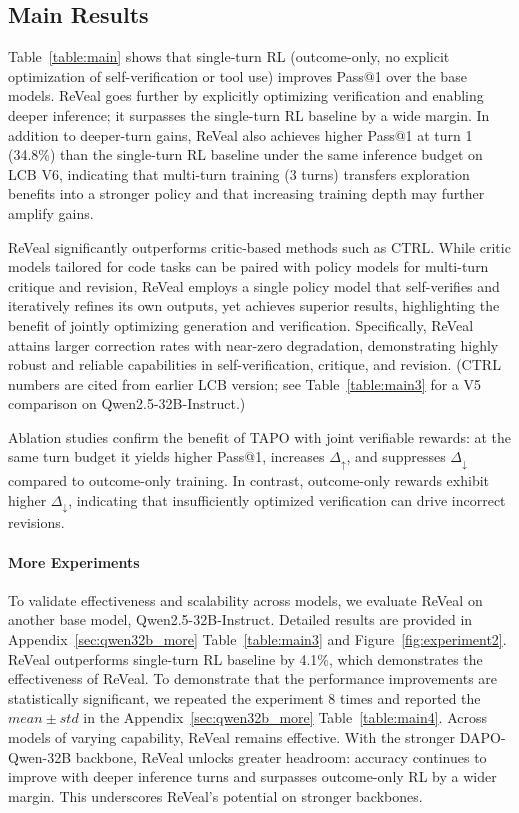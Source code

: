 \documentclass{article} %
\begin{document}
\subsection{Main Results}
Table~\ref{table:main} shows that single-turn RL (outcome-only, no explicit optimization of self-verification or tool use) improves Pass@1 over the base models. ReVeal goes further by explicitly optimizing verification and enabling deeper inference; it surpasses the single-turn RL baseline by a wide margin. In addition to deeper-turn gains, ReVeal also achieves higher Pass@1 at turn 1 (34.8\%) than the single-turn RL baseline under the same inference budget on LCB V6, indicating that multi-turn training (3 turns) transfers exploration benefits into a stronger policy and that increasing training depth may further amplify gains.

ReVeal significantly outperforms critic-based methods such as CTRL. While critic models tailored for code tasks can be paired with policy models for multi-turn critique and revision, ReVeal employs a single policy model that self-verifies and iteratively refines its own outputs, yet achieves superior results, highlighting the benefit of jointly optimizing generation and verification. Specifically, ReVeal attains larger correction rates with near-zero degradation, demonstrating highly robust and reliable capabilities in self-verification, critique, and revision. (CTRL numbers are cited from earlier LCB version; see Table~\ref{table:main3} for a V5 comparison on Qwen2.5-32B-Instruct.)

Ablation studies confirm the benefit of TAPO with joint verifiable rewards: at the same turn budget it yields higher Pass@1, increases $\Delta_{\uparrow}$, and suppresses $\Delta_{\downarrow}$ compared to outcome-only training. In contrast, outcome-only rewards exhibit higher $\Delta_{\downarrow}$, indicating that insufficiently optimized verification can drive incorrect revisions.

\paragraph{More Experiments} 
To validate effectiveness and scalability across models, we evaluate ReVeal on another base model, Qwen2.5-32B-Instruct. Detailed results are provided in Appendix~\ref{sec:qwen32b_more} Table~\ref{table:main3} and Figure~\ref{fig:experiment2}. ReVeal outperforms single-turn RL baseline by 4.1\%, which demonstrates the effectiveness of ReVeal. To demonstrate that the performance improvements are statistically significant, we repeated the experiment 8 times and reported the $mean\pm std$ in the Appendix~\ref{sec:qwen32b_more} Table~\ref{table:main4}. Across models of varying capability, ReVeal remains effective. With the stronger DAPO-Qwen-32B backbone, ReVeal unlocks greater headroom: accuracy continues to improve with deeper inference turns and surpasses outcome-only RL by a wider margin. This underscores ReVeal’s potential on stronger backbones.
\end{document}
